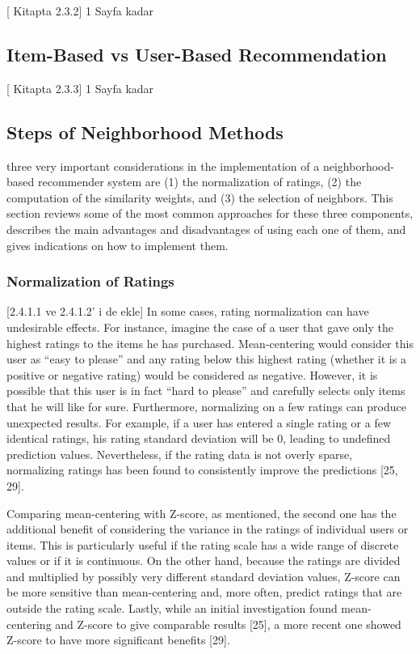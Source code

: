 [ Kitapta 2.3.2] 1 Sayfa kadar

\subsection{Item-Based vs User-Based Recommendation}

[ Kitapta 2.3.3] 1 Sayfa kadar

\subsection{Steps of Neighborhood Methods}

three very important considerations in the implementation of a neighborhood-based recommender system are (1) the normalization of ratings, (2) the computation of the similarity weights, and (3) the selection of neighbors. This section reviews some of the most common approaches for these three components, describes the main advantages and disadvantages of using each one of them, and gives indications on how to implement them.

\subsubsection{Normalization of Ratings}
[2.4.1.1 ve 2.4.1.2' i de ekle]
In some cases, rating normalization can have undesirable effects. For instance, imagine the case of a user that gave only the highest ratings to the items he has purchased. Mean-centering would consider this user as “easy to please” and any rating below this highest rating (whether it is a positive or negative rating) would be considered as negative. However, it is possible that this user is in fact “hard to please” and carefully selects only items that he will like for sure. Furthermore, normalizing on a few ratings can produce unexpected results. For example, if a user has entered a single rating or a few identical ratings, his rating standard deviation will be 0, leading to undefined prediction values. Nevertheless, if the rating data is not overly sparse, normalizing ratings has been found to consistently improve the predictions [25, 29].

Comparing mean-centering with Z-score, as mentioned, the second one has the additional benefit of considering the variance in the ratings of individual users or items. This is particularly useful if the rating scale has a wide range of discrete values or if it is continuous. On the other hand, because the ratings are divided and multiplied by possibly very different standard deviation values, Z-score can be more sensitive than mean-centering and, more often, predict ratings that are outside the rating scale. Lastly, while an initial investigation found mean-centering and Z-score to give comparable results [25], a more recent one showed Z-score to have more significant benefits [29].

